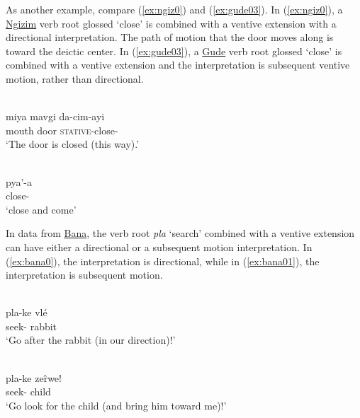As another example, compare (\ref{ex:ngiz0}) and (\ref{ex:gude03}). In (\ref{ex:ngiz0}), a \hyperref[ngiz]{Ngizim} verb root glossed `close' is combined with a ventive extension with a directional interpretation. The path of motion that the door moves along is toward the deictic center. In (\ref{ex:gude03}), a \hyperref[gude]{Gude} verb root glossed `close' is combined with a ventive extension and the interpretation is subsequent ventive motion, rather than directional. 

\ea\label{ex:ngiz0}
 \\
\gll miya mavgi da-cim-ayi	\\
mouth door \textsc{stative}-close-		\\
\glt `The door is closed (this way).'

\ex\label{ex:gude03}
 \\
\gll  pya'-a	\\
close-	\\
\glt `close and come'	
\z 

In data from \hyperref[bana]{Bana}, the verb root \textit{pla} `search' combined with a ventive extension can have either a directional or a subsequent motion interpretation. In (\ref{ex:bana0}), the interpretation is directional, while in (\ref{ex:bana01}), the interpretation is subsequent motion. 

\ea\label{ex:bana0}
 \\
\gll  pla-ke vlé	\\
seek- rabbit	\\
\glt `Go after the rabbit (in our direction)!' 

\ex\label{ex:bana01}
 \\
\gll pla-ke zer̂we!	\\
seek- child	\\
\glt `Go look for the child (and bring him toward me)!' 
\z 

